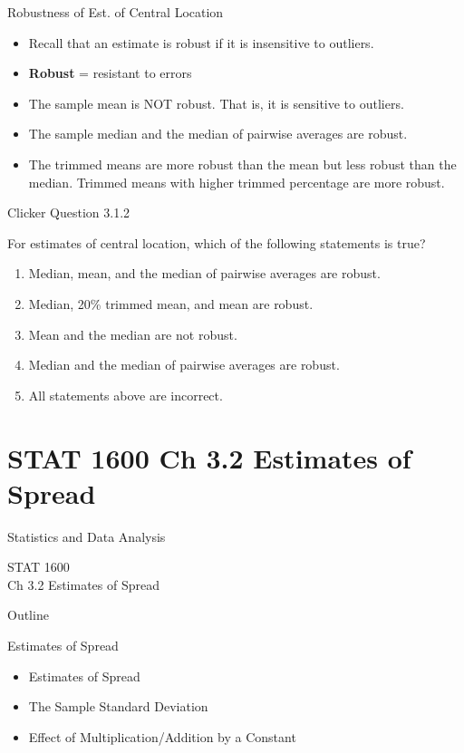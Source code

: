 \documentclass[14pt]{beamer}\usepackage[]{graphicx}\usepackage[]{color}
\begin{document}
\begin{frame}[fragile]{Robustness of Est. of Central Location}

\begin{itemize}
\item Recall that an estimate is robust if it is insensitive to outliers.
\item \textbf{Robust} = resistant to errors
\item The sample mean is NOT robust. That is, it is sensitive to  outliers.
\item The sample median and the median of pairwise averages are  robust.
\item The trimmed means are more robust than the mean but less  robust than the median. Trimmed means with higher trimmed  percentage are more robust.
\end{itemize}
\end{frame}

\begin{frame}[fragile]{Clicker Question 3.1.2}

For estimates of central location, which of the following statements is  true?

\begin{enumerate}
\item Median, mean, and the median of pairwise averages are  robust.
\item Median, 20\% trimmed mean, and mean are robust.
\item Mean and the median are not robust.
\item Median and the median of pairwise averages are robust.
\item All statements above are incorrect.
\end{enumerate}
\end{frame}



\section{STAT 1600 Ch 3.2 Estimates of Spread}

\begin{frame}[fragile]{Statistics and Data Analysis}

STAT 1600 \\
Ch 3.2 Estimates of Spread 

\end{frame}

\begin{frame}[fragile]{Outline}

Estimates of Spread  

\begin{itemize}
\item Estimates of Spread
\item The Sample Standard Deviation
\item Effect of Multiplication/Addition by a Constant 
\end{itemize}
\end{frame}
\end{document}
